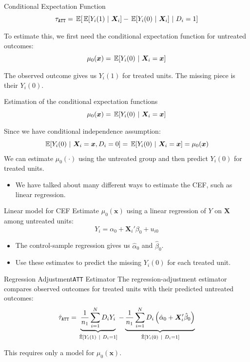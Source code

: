 \documentclass[aspectratio=169,t,11pt,table]{beamer}
\begin{document}
\begin{frame}{Conditional Expectation Function}
  $$
  \tau_{\texttt{ATT}} = \expec{\expec{Y_i(1)}{\bm{X}_i} - \expec{Y_i(0)}{\bm{X}_i}}{D_i = 1}
  $$

  \bigskip
  To estimate this, we first need the conditional expectation function for untreated outcomes:
  $$
    \mu_0(\bm{x}) = \expec{Y_i(0)}{\bm{X}_i = \bm{x}} 
  $$

  \pause
  \bigskip
  The observed outcome gives us $Y_i(1)$ for treated units. The missing piece is their $Y_i(0)$.
\end{frame}

\begin{frame}{Estimation of the conditional expectation functions}
  \vspace*{-\bigskipamount}
  $$
    \mu_0(\bm{x}) = \expec{Y_i(0)}{\bm{X}_i = \bm{x}}
  $$

  \bigskip
  Since we have conditional independence assumption: 
  $$
    \expec{Y_i(0)}{\bm{X}_i = \bm{x}, D_i = 0} = \expec{Y_i(0)}{\bm{X}_i = \bm{x}} = \mu_0(\bm{x})
  $$ 
  We can estimate $\mu_0(\cdot)$ using the untreated group and then predict $Y_i(0)$ for treated units.
  \begin{itemize}
    \item We have talked about many different ways to estimate the CEF, such as linear regression.
  \end{itemize}
\end{frame}

\begin{frame}{Linear model for CEF}
  Estimate $\mu_0(\bm{x})$ using a linear regression of $Y$ on $\bm{X}$ among untreated units:
  $$
    Y_i = \alpha_{0} + \bm{X}_{i}' \beta_0 + u_{i0}
  $$
  \begin{itemize}
    \item The control-sample regression gives us $\hat{\alpha}_{0}$ and $\hat{\beta}_{0}$.
    \item Use these estimates to predict the missing $Y_i(0)$ for each treated unit.
  \end{itemize}
\end{frame}

\begin{frame}{Regression Adjustment}{\texttt{ATT} Estimator}
  The regression-adjustment estimator compares observed outcomes for treated units with their predicted untreated outcomes:
  $$
    \hat{\tau}_{\texttt{ATT}} =
    \underbrace{
      \frac{1}{n_1} \sum_{i=1}^N D_i Y_i
    }_{\expechat{Y_i(1)}{D_i = 1}} -
    \underbrace{
      \frac{1}{n_1} \sum_{i=1}^N D_i \left( \hat{\alpha}_0 + \bm{X}_i' \hat{\beta}_0 \right)
    }_{\expechat{Y_i(0)}{D_i = 1}}
  $$
  
  \bigskip
  This requires only a model for $\mu_0(\bm{x})$.
\end{frame}
\end{document}
